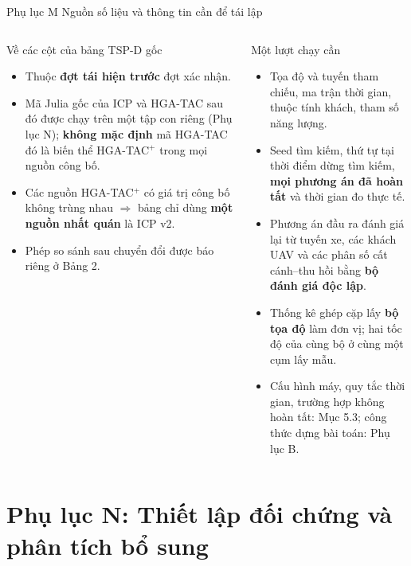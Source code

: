 \documentclass[aspectratio=169,10pt,t,xcolor={table}]{beamer}
\newcommand{\apptitle}[2]{Phụ lục #1 \textperiodcentered{} #2}
\begin{document}
\begin{frame}{\apptitle{M}{Nguồn số liệu và thông tin cần để tái lập}}
\begin{columns}[T,onlytextwidth]
\begin{block}{Về các cột của bảng TSP-D gốc}
\scriptsize
\begin{itemize}
\item Thuộc \textbf{đợt tái hiện trước} đợt xác nhận.
\item Mã Julia gốc của ICP và HGA-TAC sau đó được chạy trên một tập con riêng (Phụ lục N); \textbf{không mặc định} mã HGA-TAC đó là biến thể HGA-TAC$^+$ trong mọi nguồn công bố.
\item Các nguồn HGA-TAC$^+$ có giá trị công bố không trùng nhau $\Rightarrow$ bảng chỉ dùng \textbf{một nguồn nhất quán} là ICP v2.
\item Phép so sánh sau chuyển đổi được báo riêng ở Bảng 2.
\end{itemize}
\end{block}
\begin{block}{Một lượt chạy cần}
\scriptsize
\begin{itemize}
\item Tọa độ và tuyến tham chiếu, ma trận thời gian, thuộc tính khách, tham số năng lượng.
\item Seed tìm kiếm, thứ tự tại thời điểm dừng tìm kiếm, \textbf{mọi phương án đã hoàn tất} và thời gian đo thực tế.
\item Phương án đầu ra đánh giá lại từ tuyến xe, các khách UAV và các phân số cất cánh--thu hồi bằng \textbf{bộ đánh giá độc lập}.
\item Thống kê ghép cặp lấy \textbf{bộ tọa độ} làm đơn vị; hai tốc độ của cùng bộ ở cùng một cụm lấy mẫu.
\item Cấu hình máy, quy tắc thời gian, trường hợp không hoàn tất: Mục 5.3; công thức dựng bài toán: Phụ lục B.
\end{itemize}
\end{block}
\end{columns}
\end{frame}
\section{Phụ lục N: Thiết lập đối chứng và phân tích bổ sung}
\end{document}
